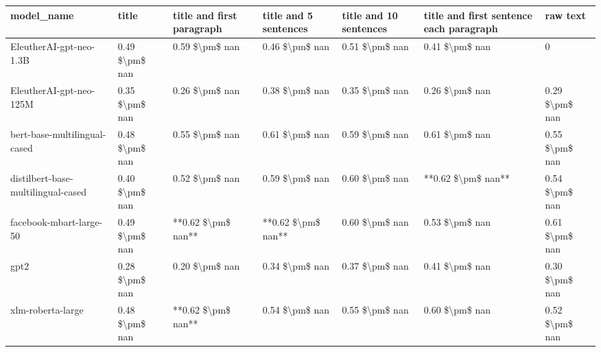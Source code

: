 \begin{tabular}{lllllll}
\toprule
                        model\_name &          title & title and first paragraph & title and 5 sentences & title and 10 sentences & title and first sentence each paragraph &       raw text \\
\midrule
           EleutherAI-gpt-neo-1.3B & 0.49 \$\textbackslash pm\$ nan &            0.59 \$\textbackslash pm\$ nan &        0.46 \$\textbackslash pm\$ nan &         0.51 \$\textbackslash pm\$ nan &                          0.41 \$\textbackslash pm\$ nan &              0 \\
           EleutherAI-gpt-neo-125M & 0.35 \$\textbackslash pm\$ nan &            0.26 \$\textbackslash pm\$ nan &        0.38 \$\textbackslash pm\$ nan &         0.35 \$\textbackslash pm\$ nan &                          0.26 \$\textbackslash pm\$ nan & 0.29 \$\textbackslash pm\$ nan \\
      bert-base-multilingual-cased & 0.48 \$\textbackslash pm\$ nan &            0.55 \$\textbackslash pm\$ nan &        0.61 \$\textbackslash pm\$ nan &         0.59 \$\textbackslash pm\$ nan &                          0.61 \$\textbackslash pm\$ nan & 0.55 \$\textbackslash pm\$ nan \\
distilbert-base-multilingual-cased & 0.40 \$\textbackslash pm\$ nan &            0.52 \$\textbackslash pm\$ nan &        0.59 \$\textbackslash pm\$ nan &         0.60 \$\textbackslash pm\$ nan &                      **0.62 \$\textbackslash pm\$ nan** & 0.54 \$\textbackslash pm\$ nan \\
           facebook-mbart-large-50 & 0.49 \$\textbackslash pm\$ nan &        **0.62 \$\textbackslash pm\$ nan** &    **0.62 \$\textbackslash pm\$ nan** &         0.60 \$\textbackslash pm\$ nan &                          0.53 \$\textbackslash pm\$ nan & 0.61 \$\textbackslash pm\$ nan \\
                              gpt2 & 0.28 \$\textbackslash pm\$ nan &            0.20 \$\textbackslash pm\$ nan &        0.34 \$\textbackslash pm\$ nan &         0.37 \$\textbackslash pm\$ nan &                          0.41 \$\textbackslash pm\$ nan & 0.30 \$\textbackslash pm\$ nan \\
                 xlm-roberta-large & 0.48 \$\textbackslash pm\$ nan &        **0.62 \$\textbackslash pm\$ nan** &        0.54 \$\textbackslash pm\$ nan &         0.55 \$\textbackslash pm\$ nan &                          0.60 \$\textbackslash pm\$ nan & 0.52 \$\textbackslash pm\$ nan \\
\bottomrule
\end{tabular}
